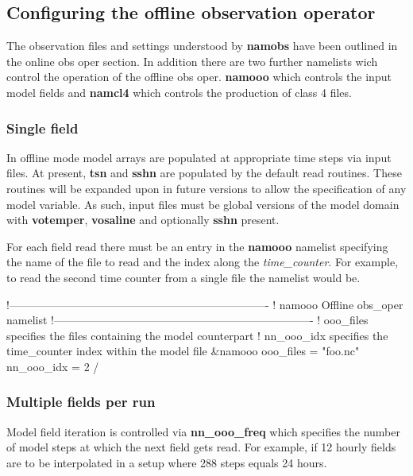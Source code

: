 \documentclass[../main/NEMO_manual]{subfiles}
\begin{document}
\subsection{Configuring the offline observation operator}
The observation files and settings understood by \textbf{namobs} have been outlined in the online obs oper section.
In addition there are two further namelists wich control the operation of the offline obs oper.
\textbf{namooo} which controls the input model fields and \textbf{namcl4} which
controls the production of class 4 files. 

\subsubsection{Single field}

In offline mode model arrays are populated at appropriate time steps via input files.
At present, \textbf{tsn} and \textbf{sshn} are populated by the default read routines. 
These routines will be expanded upon in future versions to allow the specification of any model variable.
As such, input files must be global versions of the model domain with
\textbf{votemper}, \textbf{vosaline} and optionally \textbf{sshn} present.

For each field read there must be an entry in the \textbf{namooo} namelist specifying
the name of the file to read and the index along the \emph{time\_counter}.
For example, to read the second time counter from a single file the namelist would be.

\begin{forlines}
!----------------------------------------------------------------------
!       namooo Offline obs_oper namelist
!----------------------------------------------------------------------
!   ooo_files    specifies the files containing the model counterpart
!   nn_ooo_idx   specifies the time_counter index within the model file
&namooo
   ooo_files = "foo.nc"
   nn_ooo_idx = 2
/
\end{forlines}

\subsubsection{Multiple fields per run}

Model field iteration is controlled via \textbf{nn\_ooo\_freq} which
specifies the number of model steps at which the next field gets read.
For example, if 12 hourly fields are to be interpolated in a setup where 288 steps equals 24 hours.
\end{document}
